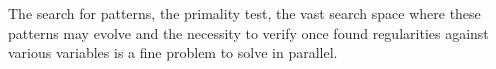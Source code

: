 The search for patterns, the primality test, the vast search space where these patterns may evolve and the necessity to verify once found regularities against various variables is a fine problem to solve in parallel.
 


